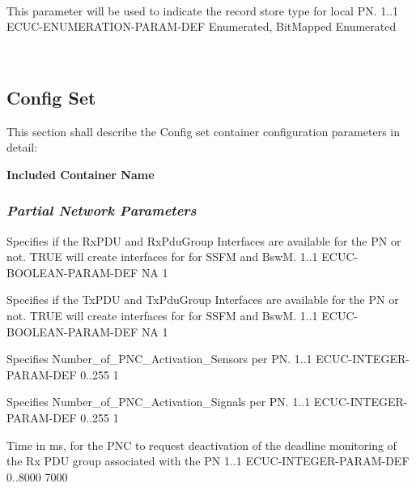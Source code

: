 \\
{}


{This parameter will be used to indicate the record store type for local PN.}
{1..1}
{ECUC-ENUMERATION-PARAM-DEF}
{Enumerated, BitMapped}
{Enumerated}

\\
{}

\subsection{Config Set}
This section shall describe the Config set container configuration parameters in detail:



\textbf{Included Container Name}


\subsubsection{\textit{Partial Network Parameters}}

{Specifies if the RxPDU and RxPduGroup Interfaces are available for the PN or not. TRUE will create interfaces for for SSFM and BswM.}
{1..1}
{ECUC-BOOLEAN-PARAM-DEF}
{NA}
{1}

\medskip

{Specifies if the TxPDU and TxPduGroup Interfaces are available for the PN or not. TRUE will create interfaces for for SSFM and BswM.}
{1..1}
{ECUC-BOOLEAN-PARAM-DEF}
{NA}
{1}

\medskip

{Specifies Number_of_PNC_Activation_Sensors per PN.}
{1..1}
{ECUC-INTEGER-PARAM-DEF}
{0..255}
{1}

\medskip

{Specifies Number_of_PNC_Activation_Signals per PN.}
{1..1}
{ECUC-INTEGER-PARAM-DEF}
{0..255}
{1}

\medskip


{Time in ms, for the PNC to request deactivation of the deadline monitoring of the Rx PDU group associated with the PN}
{1..1}
{ECUC-INTEGER-PARAM-DEF}
{0..8000}
{7000}

